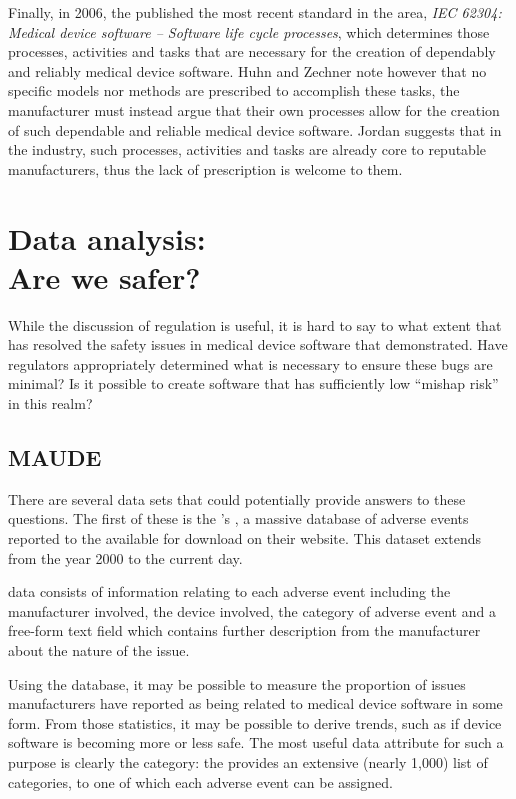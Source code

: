 \documentclass{cshonours}
\begin{document}
Finally, in 2006, the \iec published the most recent standard in the area, \textit{IEC 62304: Medical device software -- Software life cycle processes}, which determines those processes, activities and tasks that are necessary for the creation of dependably and reliably medical device software. Huhn and Zechner note however that no specific models nor methods are prescribed to accomplish these tasks, the manufacturer must instead argue that their own processes allow for the creation of such dependable and reliable medical device software. \cite{huhn2010arguing} Jordan suggests that in the industry, such processes, activities and tasks are already core to reputable manufacturers, thus the lack of prescription is welcome to them. \cite{jordan2006standard}


\chapter{Data analysis:\\Are we safer?}
\label{chap:data}
While the discussion of regulation is useful, it is hard to say to what extent that has resolved the safety issues in medical device software that \ther demonstrated. Have regulators appropriately determined what is necessary to ensure these bugs are minimal? Is it possible to create software that has sufficiently low ``mishap risk'' in this realm?

\section{MAUDE}
There are several data sets that could potentially provide answers to these questions. The first of these is the \fda's \maude, a massive database of adverse events reported to the \fda available for download on their website. This dataset extends from the year 2000 to the current day.

\maude data consists of information relating to each adverse event including the manufacturer involved, the device involved, the category of adverse event and a free-form text field which contains further description from the manufacturer about the nature of the issue.

Using the \maude database, it may be possible to measure the proportion of issues manufacturers have reported as being related to medical device software in some form. From those statistics, it may be possible to derive trends, such as if device software is becoming more or less safe. The most useful data attribute for such a purpose is clearly the category: the \fda provides an extensive (nearly 1,000) list of categories, to one of which each adverse event can be assigned.
\end{document}
